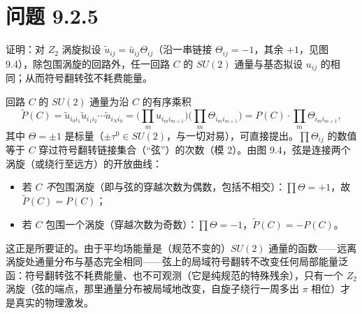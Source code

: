 \section*{问题 9.2.5}
\begin{problem}
证明：对 $Z_2$ 涡旋拟设 $\tilde{u}_{ij}=\bar{u}_{ij}\Theta_{ij}$（沿一串链接 $\Theta_{ij}=-1$，其余 $+1$，见图 9.4），除包围涡旋的回路外，任一回路 $C$ 的 $SU(2)$ 通量与基态拟设 $u_{ij}$ 的相同；从而符号翻转弦不耗费能量。
\end{problem}
\solution
回路 $C$ 的 $SU(2)$ 通量为沿 $C$ 的有序乘积
\begin{equation*}
\tilde{P}(C)=\tilde{u}_{i_0i_1}\tilde{u}_{i_1i_2}\cdots\tilde{u}_{i_Ni_0}
=\Big(\prod_{m}u_{i_mi_{m+1}}\Big)\Big(\prod_{m}\Theta_{i_mi_{m+1}}\Big)
=P(C)\cdot\prod_{m}\Theta_{i_mi_{m+1}} ,
\end{equation*}
其中 $\Theta=\pm1$ 是标量（$\pm\tau^0\in SU(2)$，与一切对易），可直接提出。$\prod\Theta_{ij}$ 的数值等于 $C$ 穿过符号翻转链接集合（“弦”）的次数（模 2）。由图 9.4，弦是连接两个涡旋（或绕行至远方）的开放曲线：
\begin{itemize}
\item 若 $C$ \emph{不}包围涡旋（即与弦的穿越次数为偶数，包括不相交）：$\prod\Theta=+1$，故 $\tilde{P}(C)=P(C)$；
\item 若 $C$ 包围一个涡旋（穿越次数为奇数）：$\prod\Theta=-1$，$\tilde{P}(C)=-P(C)$。
\end{itemize}
这正是所要证的。由于平均场能量是（规范不变的）$SU(2)$ 通量的函数——远离涡旋处通量分布与基态完全相同——弦上的局域符号翻转不改变任何局部能量泛函：符号翻转弦不耗费能量、也不可观测（它是纯规范的特殊残余），只有一个 $Z_2$ 涡旋（弦的端点，那里通量分布被局域地改变，自旋子绕行一周多出 $\pi$ 相位）才是真实的物理激发。

